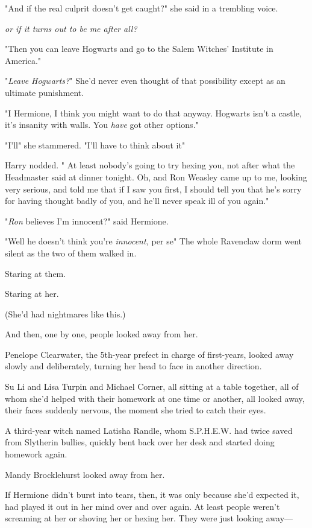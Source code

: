 "And if the real culprit doesn't get caught?" she said in a trembling voice.

\emph{{\el} or if it turns out to be me after all?}

"Then you can leave Hogwarts and go to the Salem Witches' Institute in America."

"\emph{Leave Hogwarts?}" She'd never even thought of that possibility except as
an ultimate punishment.

"I{\el} Hermione, I think you might want to do that anyway. Hogwarts isn't a
castle, it's insanity with walls. You \emph{have} got other options."

"I'll{\el}" she stammered. "I'll have{\el} to think about it{\el}"

Harry nodded. " At least nobody's going to try hexing you, not after what the
Headmaster said at dinner tonight. Oh, and Ron Weasley came up to me, looking
very serious, and told me that if I saw you first, I should tell you that he's
sorry for having thought badly of you, and he'll never speak ill of you again."

"\emph{Ron} believes I'm innocent?" said Hermione.

"Well{\el} he doesn't think you're \emph{innocent,} per se{\el}"
\sbreak
The whole Ravenclaw dorm went silent as the two of them walked in.

Staring at them.

Staring at her.

(She'd had nightmares like this.)

And then, one by one, people looked away from her.

Penelope Clearwater, the 5th-year prefect in charge of first-years, looked away
slowly and deliberately, turning her head to face in another direction.

Su Li and Lisa Turpin and Michael Corner, all sitting at a table together, all
of whom she'd helped with their homework at one time or another, all looked
away, their faces suddenly nervous, the moment she tried to catch their eyes.

A third-year witch named Latisha Randle, whom S.P.H.E.W. had twice saved from
Slytherin bullies, quickly bent back over her desk and started doing homework
again.

Mandy Brocklehurst looked away from her.

If Hermione didn't burst into tears, then, it was only because she'd expected
it, had played it out in her mind over and over again. At least people weren't
screaming at her or shoving her or hexing her. They were just looking away---

